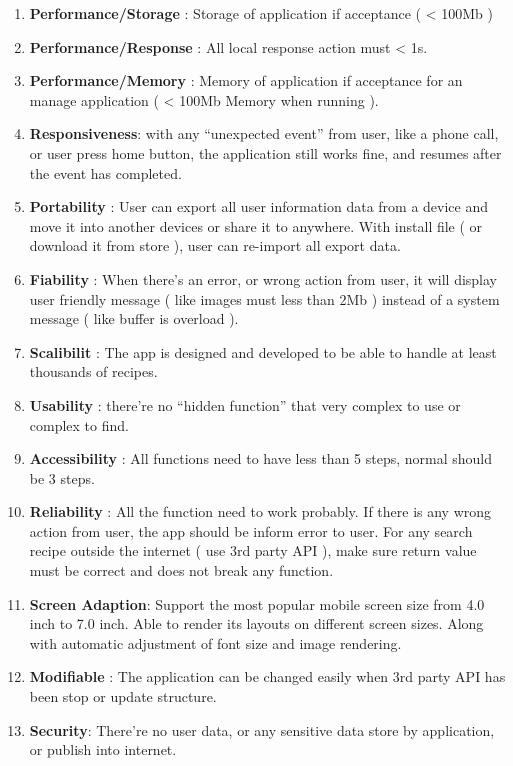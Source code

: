 \documentclass{article}
\begin{document}
    \begin{enumerate}
        \item \textbf{Performance/Storage} : Storage of application if acceptance ( < 100Mb )
        \item \textbf{Performance/Response} : All local response action must < 1s.
        \item \textbf{Performance/Memory} : Memory of application if acceptance for an manage application ( < 100Mb Memory when running ).
        \item \textbf{Responsiveness}: with any “unexpected event” from user, like a phone call, or user press home button, the application still works fine, and resumes after the event has completed. 
        \item \textbf{Portability} : User can export all user information data from a device and move it into another devices or share it to anywhere. With install file ( or download it from store ), user can re-import all export data.
        \item \textbf{Fiability} : When there's an error, or wrong action from user, it will display user friendly message ( like images must less than 2Mb ) instead of a system message ( like buffer is overload ).
        \item \textbf{Scalibilit} : The app is designed and developed to be able to handle at least thousands of recipes. 
        \item \textbf{Usability} : there’re no “hidden function” that very complex to use or complex to find. 
        \item \textbf{Accessibility} : All functions need to have less than 5 steps, normal should be 3 steps. 
        \item \textbf{Reliability} : All the function need to work probably. If there is any wrong action from user, the app should be inform error to user. For any search recipe outside the internet ( use 3rd party API ), make sure return value must be correct and does not break any function. 
        \item \textbf{Screen Adaption}: Support the most popular mobile screen size from 4.0 inch to 7.0 inch. Able to render its layouts on different screen sizes. Along with automatic adjustment of font size and image rendering. 
        \item \textbf{Modifiable} : The application can be changed easily when 3rd party API has been stop or update structure. 
        \item \textbf{Security}: There’re no user data, or any sensitive data store by application, or publish into internet. 

\end{enumerate}
\end{document}
